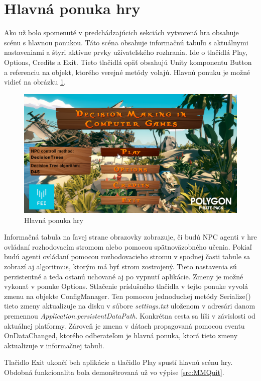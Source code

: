 \documentclass[slovak, master]{diploma}
\begin{document}
\section{Hlavná ponuka hry}
\label{sec:MainMenuAndUI}

Ako už bolo spomenuté v predchádzajúcich sekciách vytvorená hra obsahuje scénu s hlavnou ponukou. Táto scéna obsahuje informačnú tabuľu s aktuálnymi nastaveniami a štyri aktívne prvky užívateľského rozhrania. Ide o tlačidlá Play, Options, Credits a Exit. Tieto tlačidlá opäť obsahujú Unity komponentu Button a referenciu na objekt, ktorého verejné metódy volajú. Hlavnú ponuku je možné vidieť na obrázku \ref{pic:MainMenu}.

\begin{figure}[!htbp]
	\centering
	\includegraphics[width=.9\textwidth]{Figures/mainMenu.png}
	\caption{Hlavná ponuka hry}
	\label{pic:MainMenu}
\end{figure}

Informačná tabuľa na ľavej strane obrazovky zobrazuje, či budú NPC agenti v hre ovládaní rozhodovacím stromom alebo pomocou spätnoväzobného učenia. Pokiaľ budú agenti ovládaní pomocou rozhodovacieho stromu v spodnej časti tabule sa zobrazí aj algoritmus, ktorým má byť strom zostrojený. Tieto nastavenia sú perzistentné a teda ostanú uchované aj po vypnutí aplikácie. Zmeny je možné vykonať v ponuke Options. Stlačenie príslušného tlačidla v tejto ponuke vyvolá zmenu na objekte ConfigManager. Ten pomocou jednoduchej metódy Serialize() tieto zmeny aktualizuje na disku v súbore \textit{settings.txt} uloženom v adresári danom premennou \textit{Application.persistentDataPath}. Konkrétna cesta sa líši v závislosti od aktuálnej platformy. Zároveň je zmena v dátach propagovaná pomocou eventu OnDataChanged, ktorého odberateľom je hlavná ponuka, ktorá tieto zmeny aktualizuje v informačnej tabuli.

Tlačidlo Exit ukončí beh aplikácie a tlačidlo Play spustí hlavnú scénu hry. Obdobná funkcionalita bola demonštrovaná už vo výpise \ref{src:MMQuit}.
\end{document}
